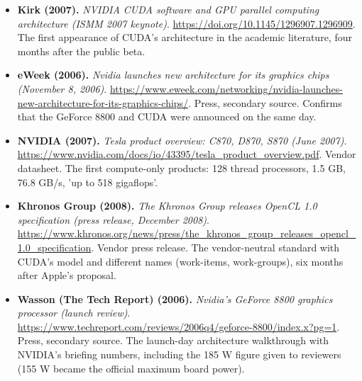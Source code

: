 \begin{itemize}[leftmargin=1.2em,itemsep=3pt]
\item \textbf{Kirk (2007).} \textit{NVIDIA CUDA software and GPU parallel computing architecture (ISMM 2007 keynote)}. \url{https://doi.org/10.1145/1296907.1296909}. The first appearance of CUDA's architecture in the academic literature, four months after the public beta.
\item \textbf{eWeek (2006).} \textit{Nvidia launches new architecture for its graphics chips (November 8, 2006)}. \url{https://www.eweek.com/networking/nvidia-launches-new-architecture-for-its-graphics-chips/}. Press, secondary source. Confirms that the GeForce 8800 and CUDA were announced on the same day.
\item \textbf{NVIDIA (2007).} \textit{Tesla product overview: C870, D870, S870 (June 2007)}. \url{https://www.nvidia.com/docs/io/43395/tesla_product_overview.pdf}. Vendor datasheet. The first compute-only products: 128 thread processors, 1.5 GB, 76.8 GB/s, 'up to 518 gigaflops'.
\item \textbf{Khronos Group (2008).} \textit{The Khronos Group releases OpenCL 1.0 specification (press release, December 2008)}. \url{https://www.khronos.org/news/press/the_khronos_group_releases_opencl_1.0_specification}. Vendor press release. The vendor-neutral standard with CUDA's model and different names (work-items, work-groups), six months after Apple's proposal.
\item \textbf{Wasson (The Tech Report) (2006).} \textit{Nvidia's GeForce 8800 graphics processor (launch review)}. \url{https://www.techreport.com/reviews/2006q4/geforce-8800/index.x?pg=1}. Press, secondary source. The launch-day architecture walkthrough with NVIDIA's briefing numbers, including the 185 W figure given to reviewers (155 W became the official maximum board power).
\end{itemize}
